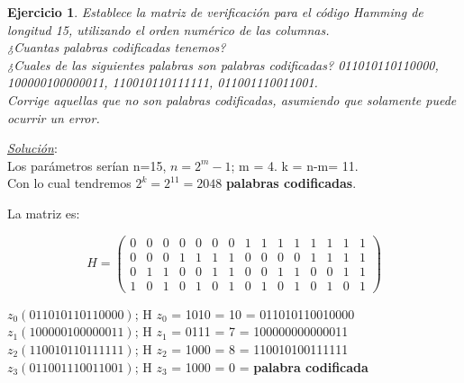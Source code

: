 \documentclass{beamer}
\theoremstyle{plain}
\theoremstyle{example}
\newtheorem{ejercicio} [Ejercicio]{Ejercicio}
\theoremstyle{example}
\begin{document}
\begin{frame}  \small \begin{ejercicio} 

Establece la matriz de verificación para el código Hamming de longitud 15, utilizando el orden numérico de las columnas. \\
\vspace*{5pt}
¿Cuantas palabras codificadas tenemos? \\
\vspace*{5pt}
¿Cuales de las siguientes palabras son palabras codificadas? 011010110110000, 100000100000011, 110010110111111, 011001110011001. \\
\vspace*{5pt}
Corrige aquellas que no son palabras codificadas, asumiendo que solamente puede ocurrir un error.\\
\vspace*{5pt}

\end{ejercicio} 
\end{frame} 

\begin{frame}  \small

\textit{\underline{Solución}}:\\ 
\vspace{0.3cm}
Los parámetros serían n=15, $n=2^m-1$; m = 4. k = n-m= 11.\\
\vspace{0.15cm}
Con lo cual tendremos $2^{k} = 2^{11}=2048$ \textbf{palabras codificadas}. 
\vspace{0.15cm}

La matriz es: 


\[
    H=   \left( \begin{array}{ccccccccccccccc}
0&	0	&0	&0&	0	&0	&0	&1	&1	&1	&1	&1	&1	&1	&1\\		
0&	0	&0	&1&	1	&1	&1	&0	&0	&0	&0	&1	&1	&1	&1\\
0&	1	&1	&0&	0	&1	&1	&0	&0	&1	&1	&0	&0	&1	&1\\
1&	0	&1	&0&	1	&0	&1	&0	&1	&0	&1	&0	&1	&0	&1
           			\end{array}
    		\right) 	    		
\]

\vspace{0.15cm}
$z_0 (011010110110000)$; H $z_0$ = 1010 = 10 = 011010110010000\\
$z_1 (100000100000011)$; H $z_1$ = 0111 = 7   = 100000000000011\\
$z_2 (110010110111111)$; H $z_2$ = 1000 = 8   = 110010100111111\\
$z_3 (011001110011001)$; H $z_3$ = 1000 = 0   = \textbf{palabra codificada}\\
\end{frame} 
\end{document}
